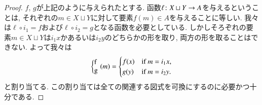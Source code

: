 \begin{proof}


$f$, $g$が上記のように与えられたとする. 函数$\ell\colon X\sqcup Y\rightarrow A$を与えるということは, それぞれの$m\in X\sqcup Y$に対して要素$f(m)\in A$を与えることに等しい. 我々は$\ell\circ i_1=f$および$\ell\circ i_2=g$となる函数を必要としている. しかしそろぞれの要素$m\in X\sqcup Y$は$i_1x$かあるいは$i_2y$のどちらかの形を取り, 両方の形を取ることはできない. よって我々は
$$\coprodmap{f}{g}(m)=\begin{cases}f(x)&\tn{if } m=i_1x,\\ g(y) &\tn{if }m=i_2y.\end{cases}$$
と割り当てる. この割り当ては全ての関連する図式を可換にするのに必要かつ十分である.

\end{proof}

